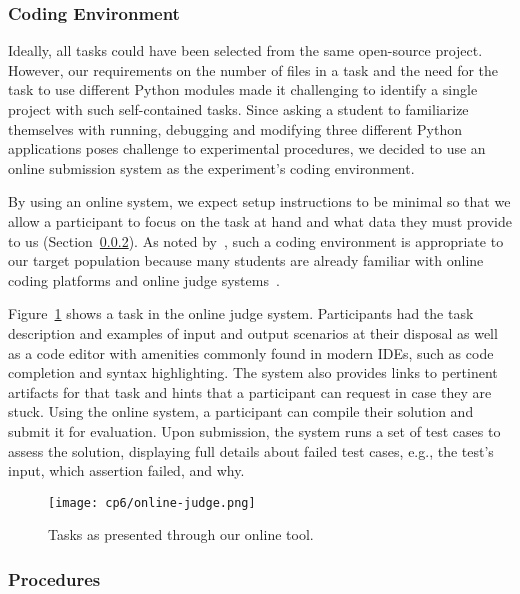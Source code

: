 \subsubsection{Coding Environment}


Ideally, all tasks could have been selected from the same open-source project. However, our requirements on the number of files in a task and the need for the task to use different Python modules made it challenging to identify a single project with such self-contained tasks. Since asking a student to familiarize themselves with running, debugging and modifying three different Python applications 
poses challenge to experimental procedures, we decided to use 
an online submission system as the experiment's coding environment.



By using an online system, we expect setup instructions to be minimal 
so that we allow a participant to focus on the task at hand and what data they must provide to us (Section~\ref{cp6:evaluation-procedures}).
As noted by~, such a coding environment is appropriate to our target population 
because many students are already familiar with online coding platforms and online judge systems~. 


Figure~\ref{fig:online-judge} shows a task in the online judge system. 
Participants had the task description and examples of input and output scenarios at their disposal as well as a code editor with amenities commonly found in modern IDEs, such as code completion and syntax highlighting. The system also provides links to pertinent artifacts for that task and hints that a participant can request in case they are stuck.
Using the online system, a participant can compile their solution and submit it for evaluation.
Upon submission, the system runs a set of test cases to assess the solution, 
 displaying full details about failed test cases, e.g., the test's input, which assertion failed, and why. 


\begin{figure}
    \centering
    \texttt{[image: cp6/online-judge.png]}
    \caption{Tasks as presented through our online tool. }
    \label{fig:online-judge}
\end{figure}





\subsubsection{Procedures}
\label{cp6:evaluation-procedures}


